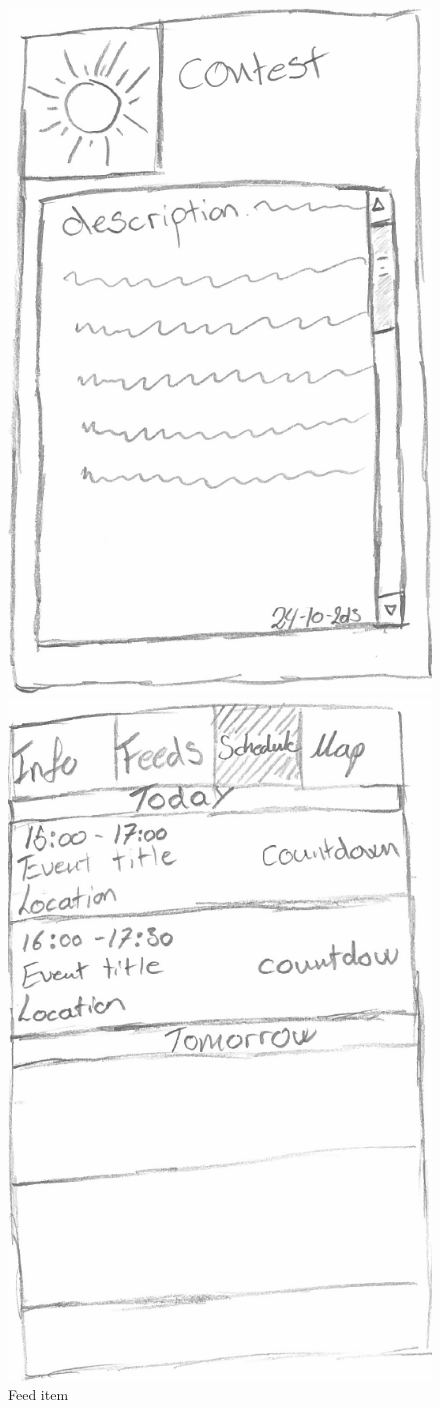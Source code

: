 \begin{figure}[H]
\begin{minipage}[b]{0.5\columnwidth}
\centering
\includegraphics[width=0.7\columnwidth]{img/prototype/5.png}
\caption{Feed item\label{fig:feeditem}}
\end{minipage}
\hspace{0.5cm}
\begin{minipage}[b]{0.5\columnwidth}
\centering
\includegraphics[width=0.7\columnwidth]{img/prototype/6.png}

\end{minipage}
\end{figure}
